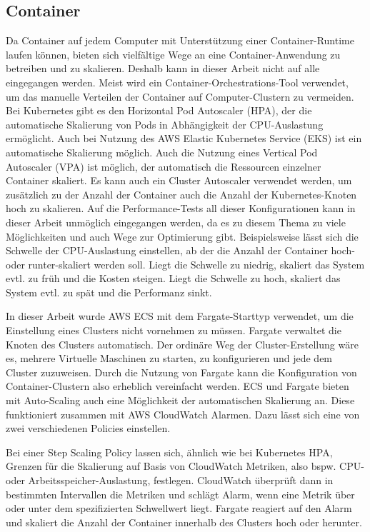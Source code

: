 \subsection{Container}
\label{subsec:skalierung-container}
Da Container auf jedem Computer mit Unterstützung einer Container-Runtime laufen können, bieten sich vielfältige Wege an eine Container-Anwendung zu betreiben und zu skalieren. Deshalb kann in dieser Arbeit nicht auf alle eingegangen werden. Meist wird ein Container-Orchestrations-Tool verwendet, um das manuelle Verteilen der Container auf Computer-Clustern zu vermeiden. Bei Kubernetes gibt es den Horizontal Pod Autoscaler (HPA), der die automatische Skalierung von Pods in Abhängigkeit der CPU-Auslastung ermöglicht\cite{noauthor_horizontal_nodate-1}. Auch bei Nutzung des AWS Elastic Kubernetes Service (EKS) ist ein automatische Skalierung möglich\cite{noauthor_horizontal_nodate}. Auch die Nutzung eines Vertical Pod Autoscaler (VPA) ist möglich, der automatisch die Ressourcen einzelner Container skaliert\cite{noauthor_vertical_nodate}. Es kann auch ein Cluster Autoscaler verwendet werden, um zusätzlich zu der Anzahl der Container auch die Anzahl der Kubernetes-Knoten hoch zu skalieren\cite{noauthor_cluster_nodate}.
Auf die Performance-Tests all dieser Konfigurationen kann in dieser Arbeit unmöglich eingegangen werden, da es zu diesem Thema zu viele Möglichkeiten und auch Wege zur Optimierung gibt. Beispielsweise lässt sich die Schwelle der CPU-Auslastung einstellen, ab der die Anzahl der Container hoch- oder runter-skaliert werden soll. Liegt die Schwelle zu niedrig, skaliert das System evtl. zu früh und die Kosten steigen. Liegt die Schwelle zu hoch, skaliert das System evtl. zu spät und die Performanz sinkt.

In dieser Arbeit wurde AWS ECS mit dem Fargate-Starttyp verwendet, um die Einstellung eines Clusters nicht vornehmen zu müssen. Fargate verwaltet die Knoten des Clusters automatisch. Der ordinäre Weg der Cluster-Erstellung wäre es, mehrere Virtuelle Maschinen zu starten, zu konfigurieren und jede dem Cluster zuzuweisen. Durch die Nutzung von Fargate kann die Konfiguration von Container-Clustern also erheblich vereinfacht werden. ECS und Fargate bieten mit Auto-Scaling auch eine Möglichkeit der automatischen Skalierung an. Diese funktioniert zusammen mit AWS CloudWatch Alarmen. Dazu lässt sich eine von zwei verschiedenen Policies einstellen.

Bei einer Step Scaling Policy lassen sich, ähnlich wie bei Kubernetes HPA, Grenzen für die Skalierung auf Basis von CloudWatch Metriken, also bspw. CPU- oder Arbeitsspeicher-Auslastung, festlegen. CloudWatch überprüft dann in bestimmten Intervallen die Metriken und schlägt Alarm, wenn eine Metrik über oder unter dem spezifizierten Schwellwert liegt. Fargate reagiert auf den Alarm und skaliert die Anzahl der Container innerhalb des Clusters hoch oder herunter. 

